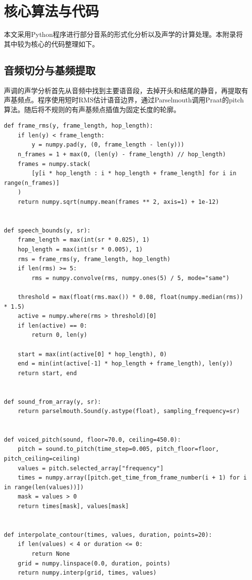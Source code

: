 \chapter{核心算法与代码}

本文采用Python程序进行部分音系的形式化分析以及声学的计算处理。本附录将其中较为核心的代码整理如下。

\section{音频切分与基频提取}

声调的声学分析首先从音频中找到主要语音段，去掉开头和结尾的静音，再提取有声基频点。程序使用短时RMS估计语音边界，通过Parselmouth调用Praat的pitch算法。随后将不规则的有声基频点插值为固定长度的轮廓。

\begin{lstlisting}[caption={基频提取与轮廓插值},label={lst:audio}]
def frame_rms(y, frame_length, hop_length):
    if len(y) < frame_length:
        y = numpy.pad(y, (0, frame_length - len(y)))
    n_frames = 1 + max(0, (len(y) - frame_length) // hop_length)
    frames = numpy.stack(
        [y[i * hop_length : i * hop_length + frame_length] for i in range(n_frames)]
    )
    return numpy.sqrt(numpy.mean(frames ** 2, axis=1) + 1e-12)


def speech_bounds(y, sr):
    frame_length = max(int(sr * 0.025), 1)
    hop_length = max(int(sr * 0.005), 1)
    rms = frame_rms(y, frame_length, hop_length)
    if len(rms) >= 5:
        rms = numpy.convolve(rms, numpy.ones(5) / 5, mode="same")

    threshold = max(float(rms.max()) * 0.08, float(numpy.median(rms)) * 1.5)
    active = numpy.where(rms > threshold)[0]
    if len(active) == 0:
        return 0, len(y)

    start = max(int(active[0] * hop_length), 0)
    end = min(int(active[-1] * hop_length + frame_length), len(y))
    return start, end


def sound_from_array(y, sr):
    return parselmouth.Sound(y.astype(float), sampling_frequency=sr)


def voiced_pitch(sound, floor=70.0, ceiling=450.0):
    pitch = sound.to_pitch(time_step=0.005, pitch_floor=floor, pitch_ceiling=ceiling)
    values = pitch.selected_array["frequency"]
    times = numpy.array([pitch.get_time_from_frame_number(i + 1) for i in range(len(values))])
    mask = values > 0
    return times[mask], values[mask]


def interpolate_contour(times, values, duration, points=20):
    if len(values) < 4 or duration <= 0:
        return None
    grid = numpy.linspace(0.0, duration, points)
    return numpy.interp(grid, times, values)
\end{lstlisting}

